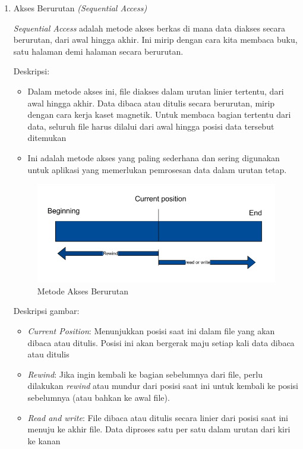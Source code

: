 \documentclass[12pt]{article}
\begin{document}
\begin{enumerate}
    \item Akses Berurutan \textit{(Sequential Access)}
    
    \textit{Sequential Access} adalah  metode akses berkas di mana data diakses secara berurutan, dari awal hingga akhir. Ini mirip dengan cara kita membaca buku, satu halaman demi halaman secara berurutan.

    {Deskripsi:}
    \begin{itemize}
        \item Dalam metode akses ini, file diakses dalam urutan linier tertentu, dari awal hingga akhir. Data dibaca atau ditulis secara berurutan, mirip dengan cara kerja kaset magnetik. Untuk membaca bagian tertentu dari data, seluruh file harus dilalui dari awal hingga posisi data tersebut ditemukan
        \item Ini adalah metode akses yang paling sederhana dan sering digunakan untuk aplikasi yang memerlukan pemrosesan data dalam urutan tetap.
    \end{itemize}

    \begin{figure}[h]
        \centering
        \includegraphics[width=0.5\linewidth]{assets/Screenshot 2024-09-30 184303.png}
        \caption{Metode Akses Berurutan}
        \label{fig:sequential-access}
    \end{figure}

    {Deskripsi gambar:}
     \begin{itemize}
        \item \textit{Current Position}: Menunjukkan posisi saat ini dalam file yang akan dibaca atau ditulis. Posisi ini akan bergerak maju setiap kali data dibaca atau ditulis

        \item \textit{Rewind}: Jika ingin kembali ke bagian sebelumnya dari file, perlu dilakukan \textit{rewind} atau mundur dari posisi saat ini untuk kembali ke posisi sebelumnya (atau bahkan ke awal file).

        \item \textit{Read and write}: File dibaca atau ditulis secara linier dari posisi saat ini menuju ke akhir file. Data diproses satu per satu dalam urutan dari kiri ke kanan


\end{itemize}
\end{enumerate}
\end{document}
